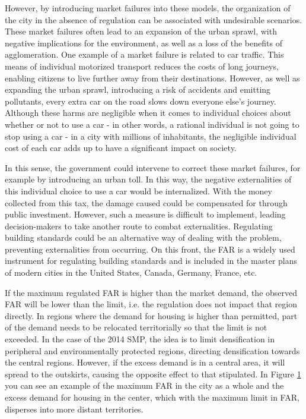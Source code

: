 However, by introducing market failures into these models, the organization of the city in the absence of regulation can be associated with undesirable scenarios. These market failures often lead to an expansion of the urban sprawl, with negative implications for the environment, as well as a loss of the benefits of agglomeration. One example of a market failure is related to car traffic. This means of individual motorized transport reduces the costs of long journeys, enabling citizens to live further away from their destinations. However, as well as expanding the urban sprawl, introducing a risk of accidents and emitting pollutants, every extra car on the road slows down everyone else's journey. Although these harms are negligible when it comes to individual choices about whether or not to use a car - in other words, a rational individual is not going to stop using a car - in a city with millions of inhabitants, the negligible individual cost of each car adds up to have a significant impact on society.

In this sense, the government could intervene to correct these market failures, for example by introducing an urban toll. In this way, the negative externalities of this individual choice to use a car would be internalized. With the money collected from this tax, the damage caused could be compensated for through public investment. However, such a measure is difficult to implement, leading decision-makers to take another route to combat externalities. Regulating building standards could be an alternative way of dealing with the problem, preventing externalities from occurring. On this front, the FAR is a widely used instrument for regulating building standards and is included in the master plans of modern cities in the United States, Canada, Germany, France, etc.

\begin{figure}[h]
    \caption{Impact of regulation on the city's FAR}
    \centering
    \begin{subfigure}{.6\linewidth}
        
    \end{subfigure}
    \label{fig:FAR}
\end{figure}

If the maximum regulated FAR is higher than the market demand, the observed FAR will be lower than the limit, i.e. the regulation does not impact that region directly. In regions where the demand for housing is higher than permitted, part of the demand needs to be relocated territorially so that the limit is not exceeded. In the case of the 2014 SMP, the idea is to limit densification in peripheral and environmentally protected regions, directing densification towards the central regions. However, if the excess demand is in a central area, it will spread to the outskirts, causing the opposite effect to that stipulated. In Figure \ref{fig:FAR} you can see an example of the maximum FAR in the city as a whole and the excess demand for housing in the center, which with the maximum limit in FAR, disperses into more distant territories.


